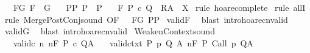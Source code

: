 \begin{isabellebody}
\ \ \ F{\isacharunderscore}G{\isacharcolon}\ {\isachardoublequoteopen}F\ {\isasymsubseteq}\ G{\isachardoublequoteclose}\isanewline
\ \ \ P{\isacharunderscore}P{\isacharprime}{\isacharcolon}\ {\isachardoublequoteopen}P\ {\isasymsubseteq}\ P{\isacharprime}{\isachardoublequoteclose}\isanewline
\ \ \ {\isachardoublequoteopen}{\isasymGamma}{\isacharcomma}{\isasymTheta}{\isasymturnstile}\isactrlbsub {\isacharslash}F\isactrlesub \ P\ c\ {\isacharparenleft}Q\ {\isasyminter}\ R{\isacharparenright}{\isacharcomma}{\isacharparenleft}A\ {\isasyminter}\ X{\isacharparenright}{\isachardoublequoteclose}\isanewline
%
\isadelimproof
%
\endisadelimproof
%
\isatagproof
{}\isamarkupfalse%
\ {\isacharparenleft}rule\ hoare{\isacharunderscore}complete{\isacharprime}{\isacharparenright}\isanewline
{}\isamarkupfalse%
\ {\isacharparenleft}rule\ allI{\isacharparenright}\isanewline
{}\isamarkupfalse%
\ {\isacharparenleft}rule\ Merge{\isacharunderscore}PostConj{\isacharunderscore}sound\ {\isacharbrackleft}OF\ {\isacharunderscore}\ {\isacharunderscore}\ F{\isacharunderscore}G\ P{\isacharunderscore}P{\isacharprime}{\isacharbrackright}{\isacharparenright}\isanewline
{}\isamarkupfalse%
\ validF\ \isamarkupfalse%
\ {\isacharparenleft}blast\ intro{\isacharcolon}hoare{\isacharunderscore}cnvalid{\isacharparenright}\isanewline
{}\isamarkupfalse%
\ validG\ \isamarkupfalse%
\ {\isacharparenleft}blast\ intro{\isacharcolon}hoare{\isacharunderscore}cnvalid{\isacharparenright}\isanewline
{}\isamarkupfalse%
%
\endisatagproof
{\isafoldproof}%
%
\isadelimproof
%
\endisadelimproof
%
\isamarkuptrue%
\isamarkupfalse%
\ WeakenContext{\isacharunderscore}sound{\isacharcolon}\isanewline
\ \ \ valid{\isacharunderscore}c{\isacharcolon}\ {\isachardoublequoteopen}{\isasymforall}n{\isachardot}\ {\isasymGamma}{\isacharcomma}{\isasymTheta}{\isacharprime}{\isasymTurnstile}n{\isacharcolon}\isactrlbsub {\isacharslash}F\isactrlesub \ P\ c\ Q{\isacharcomma}A{\isachardoublequoteclose}\isanewline
\ \ \ valid{\isacharunderscore}ctxt{\isacharcolon}\ {\isachardoublequoteopen}{\isasymforall}{\isacharparenleft}P{\isacharcomma}\ p{\isacharcomma}\ Q{\isacharcomma}\ A{\isacharparenright}{\isasymin}{\isasymTheta}{\isacharprime}{\isachardot}\ {\isasymGamma}{\isacharcomma}{\isasymTheta}{\isasymTurnstile}n{\isacharcolon}\isactrlbsub {\isacharslash}F\isactrlesub \ P\ {\isacharparenleft}Call\ p{\isacharparenright}\ Q{\isacharcomma}A{\isachardoublequoteclose}\ \isanewline

\end{isabellebody}
